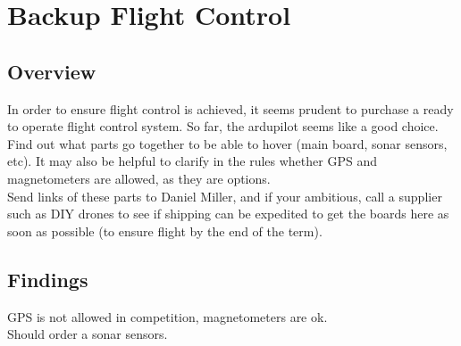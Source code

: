 \documentclass[12pt,letterpaper]{article}
\begin{document}
\section{Backup Flight Control}
\subsection{Overview}
In order to ensure flight control is achieved, it seems prudent to purchase
a ready to operate flight control system. So far, the ardupilot seems like
a good choice. Find out what parts go together to be able to hover (main board,
sonar sensors, etc). It may also be helpful to clarify in the rules whether
GPS and magnetometers are allowed, as they are options.\\
Send links of these parts to Daniel Miller, and if your ambitious, call a
supplier such as DIY drones to see if shipping can be expedited to get the
boards here as soon as possible (to ensure flight by the end of the term).
\subsection{Findings}
GPS is not allowed in competition, magnetometers are ok.\\
Should order a sonar sensors.\\
\end{document}
